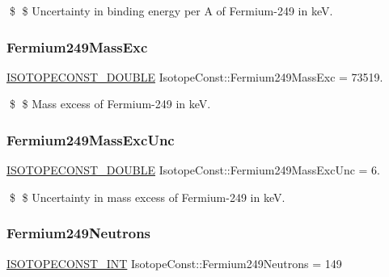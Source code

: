 \$ \$ Uncertainty in binding energy per A of Fermium-\/249 in keV. \mbox{\label{group___isotope_const-_fermium-_fm249_ga77cd923831a9f1b08cddefe4f79f0b24}} 
\subsubsection{\texorpdfstring{Fermium249\+Mass\+Exc}{Fermium249MassExc}}
{\footnotesize\ttfamily \mbox{\hyperlink{group___isotope_const-_macros_ga8f45a7272ce02c0b4c65c44636ed719a}{I\+S\+O\+T\+O\+P\+E\+C\+O\+N\+S\+T\+\_\+\+D\+O\+U\+B\+LE}} Isotope\+Const\+::\+Fermium249\+Mass\+Exc = 73519.}

\$ \$ Mass excess of Fermium-\/249 in keV. \mbox{\label{group___isotope_const-_fermium-_fm249_ga0422193e316764517ca9b11c21daaca7}} 
\subsubsection{\texorpdfstring{Fermium249\+Mass\+Exc\+Unc}{Fermium249MassExcUnc}}
{\footnotesize\ttfamily \mbox{\hyperlink{group___isotope_const-_macros_ga8f45a7272ce02c0b4c65c44636ed719a}{I\+S\+O\+T\+O\+P\+E\+C\+O\+N\+S\+T\+\_\+\+D\+O\+U\+B\+LE}} Isotope\+Const\+::\+Fermium249\+Mass\+Exc\+Unc = 6.}

\$ \$ Uncertainty in mass excess of Fermium-\/249 in keV. \mbox{\label{group___isotope_const-_fermium-_fm249_ga431617cc2c24c4609c93167ed3bc8263}} 
\subsubsection{\texorpdfstring{Fermium249\+Neutrons}{Fermium249Neutrons}}
{\footnotesize\ttfamily \mbox{\hyperlink{group___isotope_const-_macros_ga5f18360b3e99483a35c32d789e62621c}{I\+S\+O\+T\+O\+P\+E\+C\+O\+N\+S\+T\+\_\+\+I\+NT}} Isotope\+Const\+::\+Fermium249\+Neutrons = 149}

